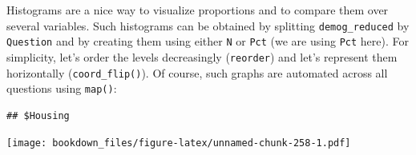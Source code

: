 \documentclass[
]{krantz}
\makeatletter
\newenvironment{Shaded}{\begin{snugshade}}{\end{snugshade}}
\newcommand{\AttributeTok}[1]{\textcolor[rgb]{0.61,0.61,0.61}{#1}}
\newcommand{\ControlFlowTok}[1]{\textcolor[rgb]{0.27,0.27,0.27}{\textbf{#1}}}
\newcommand{\DecValTok}[1]{\textcolor[rgb]{0.06,0.06,0.06}{#1}}
\newcommand{\FunctionTok}[1]{\textcolor[rgb]{0,0,0}{#1}}
\newcommand{\NormalTok}[1]{#1}
\newcommand{\OtherTok}[1]{\textcolor[rgb]{0.37,0.37,0.37}{#1}}
\newcommand{\SpecialCharTok}[1]{\textcolor[rgb]{0,0,0}{#1}}
\newcommand{\StringTok}[1]{\textcolor[rgb]{0.5,0.5,0.5}{#1}}
\newenvironment{kframe}{%
\medskip{}
\setlength{\fboxsep}{.8em}
 \def\at@end@of@kframe{}%
 \ifinner\ifhmode%
  \def\at@end@of@kframe{\end{minipage}}%
  \begin{minipage}{\columnwidth}%
 \fi\fi%
 \def\FrameCommand##1{\hskip\@totalleftmargin \hskip-\fboxsep
 \colorbox{shadecolor}{##1}\hskip-\fboxsep
     \hskip-\linewidth \hskip-\@totalleftmargin \hskip\columnwidth}%
 \MakeFramed {\advance\hsize-\width
   \@totalleftmargin\z@ \linewidth\hsize
   \@setminipage}}%
 {\par\unskip\endMakeFramed%
 \at@end@of@kframe}
\renewenvironment{Shaded}{\begin{kframe}}{\end{kframe}}
\makeatother
\begin{document}
Histograms are a nice way to visualize proportions and to compare them over several variables. Such histograms can be obtained by splitting \texttt{demog\_reduced} by \texttt{Question} and by creating them using either \texttt{N} or \texttt{Pct} (we are using \texttt{Pct} here). For simplicity, let's order the levels decreasingly (\texttt{reorder}) and let's represent them horizontally (\texttt{coord\_flip()}). Of course, such graphs are automated across all questions using \texttt{map()}:

\begin{Shaded}
\end{Shaded}

\begin{verbatim}
## $Housing
\end{verbatim}

\texttt{[image: bookdown\_files/figure-latex/unnamed-chunk-258-1.pdf]}
\end{document}
